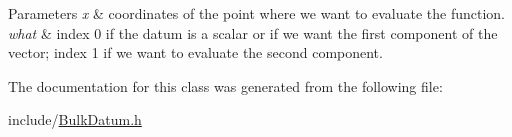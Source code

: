 \begin{DoxyParams}{Parameters}
{\em x} & coordinates of the point where we want to evaluate the function. \\
\hline
{\em what} & index 0 if the datum is a scalar or if we want the first component of the vector; index 1 if we want to evaluate the second component. \\
\hline
\end{DoxyParams}


The documentation for this class was generated from the following file\+:\begin{DoxyCompactItemize}
\item 
include/\hyperlink{BulkDatum_8h}{Bulk\+Datum.\+h}\end{DoxyCompactItemize}
